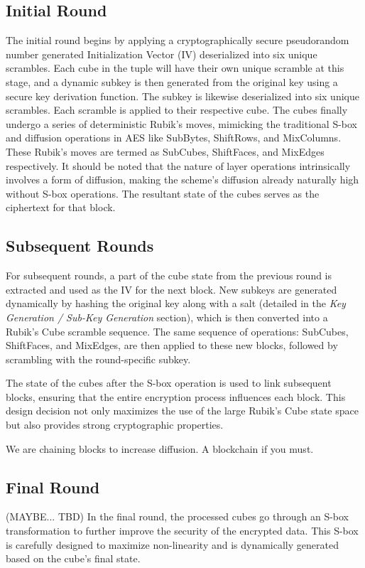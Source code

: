 \documentclass[12pt]{article}
\begin{document}
\subsection{Initial Round}
The initial round begins by applying a cryptographically secure pseudorandom number generated Initialization Vector (IV) deserialized into six unique scrambles. Each cube in the tuple will have their own unique scramble at this stage, and a dynamic subkey is then generated from the original key using a secure key derivation function. The subkey is likewise deserialized into six unique scrambles. Each scramble is applied to their respective cube. The cubes finally undergo a series of deterministic Rubik's moves, mimicking the traditional S-box and diffusion operations in AES like SubBytes, ShiftRows, and MixColumns. These Rubik's moves are termed as SubCubes, ShiftFaces, and MixEdges respectively. It should be noted that the nature of layer operations intrinsically involves a form of diffusion, making the scheme's diffusion already naturally high without S-box operations. The resultant state of the cubes serves as the ciphertext for that block.

\subsection{Subsequent Rounds}
For subsequent rounds, a part of the cube state from the previous round is extracted and used as the IV for the next block. New subkeys are generated dynamically by hashing the original key along with a salt (detailed in the \textit{Key Generation / Sub-Key Generation} section), which is then converted into a Rubik's Cube scramble sequence. The same sequence of operations: SubCubes, ShiftFaces, and MixEdges, are then applied to these new blocks, followed by scrambling with the round-specific subkey.

The state of the cubes after the S-box operation is used to link subsequent blocks, ensuring that the entire encryption process influences each block. This design decision not only maximizes the use of the large Rubik's Cube state space but also provides strong cryptographic properties.

We are chaining blocks to increase diffusion. A blockchain if you must.
\subsection{Final Round}

(MAYBE... TBD) In the final round, the processed cubes go through an S-box transformation to further improve the security of the encrypted data. This S-box is carefully designed to maximize non-linearity and is dynamically generated based on the cube's final state.
\end{document}
